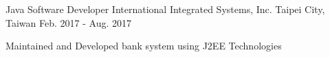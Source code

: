 \begin{cventries}
  \cventry
    {Java Software Developer} %
    {International Integrated Systems, Inc.} %
    {Taipei City, Taiwan} %
    {Feb. 2017 - Aug. 2017} %
    {
      \begin{cvitems} %
        \item {Maintained and Developed bank system using J2EE Technologies}
      \end{cvitems}
    }

 
\end{cventries}
